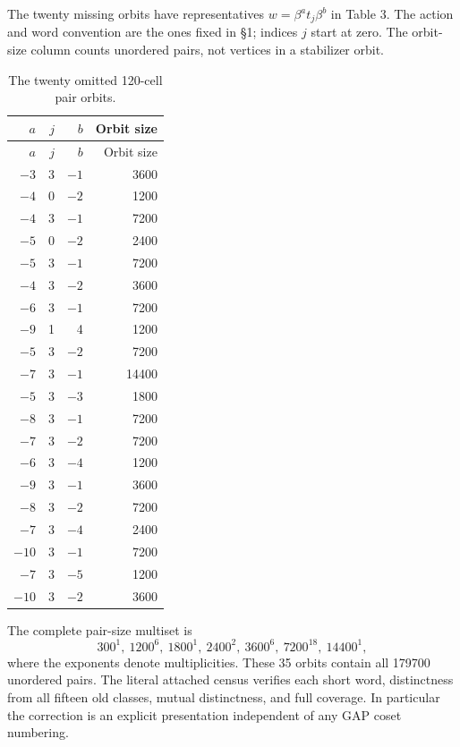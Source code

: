 The twenty missing orbits have representatives \(w=\beta^a t_j\beta^b\) in Table 3. The action and word convention are the ones fixed in §1; indices \(j\) start at zero. The orbit-size column counts unordered pairs, not vertices in a stabilizer orbit.

\begin{longtable}[]{@{}rrrr@{}}
\caption{The twenty omitted 120-cell pair orbits.}\tabularnewline
\toprule\noalign{}
\(a\) & \(j\) & \(b\) & Orbit size \\
\midrule\noalign{}
\endfirsthead
\toprule\noalign{}
\(a\) & \(j\) & \(b\) & Orbit size \\
\midrule\noalign{}
\endhead
\bottomrule\noalign{}
\endlastfoot
\(-3\) & 3 & \(-1\) & 3600 \\
\(-4\) & 0 & \(-2\) & 1200 \\
\(-4\) & 3 & \(-1\) & 7200 \\
\(-5\) & 0 & \(-2\) & 2400 \\
\(-5\) & 3 & \(-1\) & 7200 \\
\(-4\) & 3 & \(-2\) & 3600 \\
\(-6\) & 3 & \(-1\) & 7200 \\
\(-9\) & 1 & 4 & 1200 \\
\(-5\) & 3 & \(-2\) & 7200 \\
\(-7\) & 3 & \(-1\) & 14400 \\
\(-5\) & 3 & \(-3\) & 1800 \\
\(-8\) & 3 & \(-1\) & 7200 \\
\(-7\) & 3 & \(-2\) & 7200 \\
\(-6\) & 3 & \(-4\) & 1200 \\
\(-9\) & 3 & \(-1\) & 3600 \\
\(-8\) & 3 & \(-2\) & 7200 \\
\(-7\) & 3 & \(-4\) & 2400 \\
\(-10\) & 3 & \(-1\) & 7200 \\
\(-7\) & 3 & \(-5\) & 1200 \\
\(-10\) & 3 & \(-2\) & 3600 \\
\end{longtable}

The complete pair-size multiset is
\[
 300^1,\ 1200^6,\ 1800^1,\ 2400^2,\ 3600^6,\ 7200^{18},\ 14400^1,
                                                               \tag{9}
\]
where the exponents denote multiplicities. These 35 orbits contain all 179700 unordered pairs. The literal attached census verifies each short word, distinctness from all fifteen old classes, mutual distinctness, and full coverage. In particular the correction is an explicit presentation independent of any GAP coset numbering.

